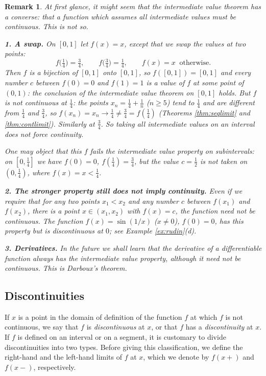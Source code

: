 \documentclass{article}
\theoremstyle{mythm}
\newtheorem{remark}[theorem]{Remark}
\begin{document}
\begin{remark}\label{rem:ivtconverse}
At first glance, it might seem that the intermediate value theorem has a converse: that a function which assumes all intermediate values must be continuous. This is not so.

\textbf{1. A swap.} On $[0,1]$ let $f(x) = x$, except that we swap the values at two points:
\[
f\big(\tfrac14\big) = \tfrac34, \qquad f\big(\tfrac34\big) = \tfrac14, \qquad f(x) = x \ \text{ otherwise}.
\]
Then $f$ is a bijection of $[0,1]$ onto $[0,1]$, so $f([0,1]) = [0,1]$ and every number $c$ between $f(0) = 0$ and $f(1) = 1$ is a value of $f$ at some point of $(0,1)$: the conclusion of the intermediate value theorem on $[0,1]$ holds. But $f$ is not continuous at $\frac14$: the points $x_n = \frac14 + \frac{1}{n}$ ($n \geq 5$) tend to $\frac14$ and are different from $\frac14$ and $\frac34$, so $f(x_n) = x_n \to \frac14 \neq \frac34 = f(\frac14)$ (Theorems \ref{thm:seqlimit} and \ref{thm:contlimit}). Similarly at $\frac34$. So taking all intermediate values on an interval does not force continuity.

One may object that this $f$ fails the intermediate value property on \textit{subintervals}: on $[0, \frac14]$ we have $f(0) = 0$, $f(\frac14) = \frac34$, but the value $c = \frac12$ is not taken on $(0, \frac14)$, where $f(x) = x < \frac14$.

\textbf{2. The stronger property still does not imply continuity.} Even if we require that \textit{for any two points $x_1 < x_2$ and any number $c$ between $f(x_1)$ and $f(x_2)$, there is a point $x \in (x_1, x_2)$ with $f(x) = c$}, the function need not be continuous. The function $f(x) = \sin(1/x)$ ($x \neq 0$), $f(0) = 0$, has this property but is discontinuous at $0$; see Example \ref{ex:rudin}(d).

\textbf{3. Derivatives.} In the future we shall learn that the derivative of a differentiable function always has the intermediate value property, although it need not be continuous. This is \textit{Darboux's theorem}.
\end{remark}

\subsection{Discontinuities}

If $x$ is a point in the domain of definition of the function $f$ at which $f$ is not continuous, we say that $f$ is \textit{discontinuous} at $x$, or that $f$ has a \textit{discontinuity} at $x$. If $f$ is defined on an interval or on a segment, it is customary to divide discontinuities into two types. Before giving this classification, we define the right-hand and the left-hand limits of $f$ at $x$, which we denote by $f(x+)$ and $f(x-)$, respectively.
\end{document}

